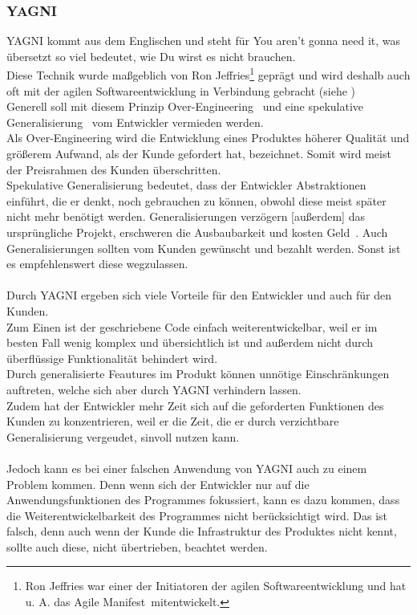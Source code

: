 \documentclass[a4paper, 10pt]{scrartcl}
\begin{document}
\subsubsection{YAGNI}
\glqq YAGNI\grqq{} kommt aus dem Englischen und steht für \glqq You aren't gonna need it\grqq, was übersetzt so viel bedeutet, wie \glqq Du wirst es nicht brauchen.\grqq\\
Diese Technik wurde maßgeblich von Ron Jeffries\footnote[2]{Ron Jeffries war einer der Initiatoren der agilen Softwareentwicklung und hat u. A. das \glqq Agile Manifest\grqq\ mitentwickelt.} geprägt und wird deshalb auch oft mit der agilen Softwareentwicklung in Verbindung gebracht (siehe  ) \citep{Jeffries}\\
Generell soll mit diesem Prinzip \glqq Over-Engineering\grqq \  \cite{goll_entwurfsprinzipien} und eine \glqq spekulative Generalisierung\grqq\  \cite{goll_entwurfsprinzipien} vom Entwickler vermieden werden.\\
Als Over-Engineering wird die Entwicklung eines Produktes höherer Qualität und größerem Aufwand, als der Kunde gefordert hat, bezeichnet. Somit wird meist der Preisrahmen des Kunden überschritten.\\
Spekulative Generalisierung bedeutet, dass der Entwickler Abstraktionen einführt, die er denkt, noch gebrauchen zu können, obwohl diese meist später nicht mehr benötigt werden. \glqq Generalisierungen verzögern [außerdem] das ursprüngliche Projekt, erschweren die Ausbaubarkeit und kosten Geld\grqq \ \cite{goll_entwurfsprinzipien}. Auch Generalisierungen sollten vom Kunden gewünscht und bezahlt werden. Sonst ist es empfehlenswert diese wegzulassen.\\\\
Durch YAGNI ergeben sich viele Vorteile für den Entwickler und auch für den Kunden.\\
Zum Einen ist der geschriebene Code einfach weiterentwickelbar, weil er im besten Fall wenig komplex und übersichtlich ist und außerdem nicht durch überflüssige Funktionalität behindert wird.\\
Durch generalisierte Feautures im Produkt können unnötige Einschränkungen auftreten, welche sich aber durch YAGNI verhindern lassen.\\
Zudem hat der Entwickler mehr Zeit sich auf die geforderten Funktionen des Kunden zu konzentrieren, weil er die Zeit, die er durch verzichtbare Generalisierung vergeudet, sinvoll nutzen kann.\\\\
Jedoch kann es bei einer falschen Anwendung von YAGNI auch zu einem Problem kommen. Denn wenn sich der Entwickler nur auf die Anwendungsfunktionen des Programmes fokussiert, kann es dazu kommen, dass die Weiterentwickelbarkeit des Programmes nicht berücksichtigt wird. Das ist falsch, denn auch wenn der Kunde die Infrastruktur des Produktes nicht kennt, sollte auch diese, nicht übertrieben, beachtet werden. \citep{goll_entwurfsprinzipien}
\end{document}
